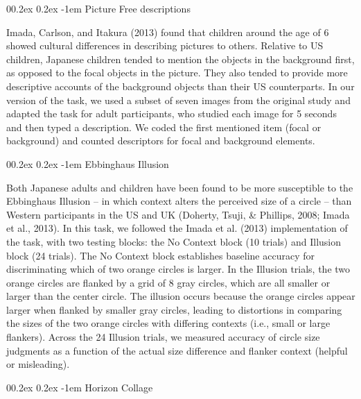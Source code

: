 \documentclass[
  man]{apa6}
\makeatletter
\let\oldparagraph\paragraph
\renewcommand{\paragraph}[1]{\oldparagraph{#1}\mbox{}}
\renewcommand{\paragraph}{\@startsection{paragraph}{4}{\parindent}%
  {0\baselineskip \@plus 0.2ex \@minus 0.2ex}%
  {-1em}%
  {\normalfont\normalsize\bfseries\itshape\typesectitle}}
\makeatother
\begin{document}
\hypertarget{picture-free-descriptions}{%
\paragraph{Picture Free descriptions}\label{picture-free-descriptions}}

Imada, Carlson, and Itakura (2013) found that children around the age of 6 showed cultural differences in describing pictures to others. Relative to US children, Japanese children tended to mention the objects in the background first, as opposed to the focal objects in the picture. They also tended to provide more descriptive accounts of the background objects than their US counterparts. In our version of the task, we used a subset of seven images from the original study and adapted the task for adult participants, who studied each image for 5 seconds and then typed a description. We coded the first mentioned item (focal or background) and counted descriptors for focal and background elements.

\hypertarget{ebbinghaus-illusion}{%
\paragraph{Ebbinghaus Illusion}\label{ebbinghaus-illusion}}

Both Japanese adults and children have been found to be more susceptible to the Ebbinghaus Illusion -- in which context alters the perceived size of a circle -- than Western participants in the US and UK (Doherty, Tsuji, \& Phillips, 2008; Imada et al., 2013). In this task, we followed the Imada et al. (2013) implementation of the task, with two testing blocks: the No Context block (10 trials) and Illusion block (24 trials). The No Context block establishes baseline accuracy for discriminating which of two orange circles is larger. In the Illusion trials, the two orange circles are flanked by a grid of 8 gray circles, which are all smaller or larger than the center circle. The illusion occurs because the orange circles appear larger when flanked by smaller gray circles, leading to distortions in comparing the sizes of the two orange circles with differing contexts (i.e., small or large flankers). Across the 24 Illusion trials, we measured accuracy of circle size judgments as a function of the actual size difference and flanker context (helpful or misleading).

\hypertarget{horizon-collage}{%
\paragraph{Horizon Collage}\label{horizon-collage}}
\end{document}

